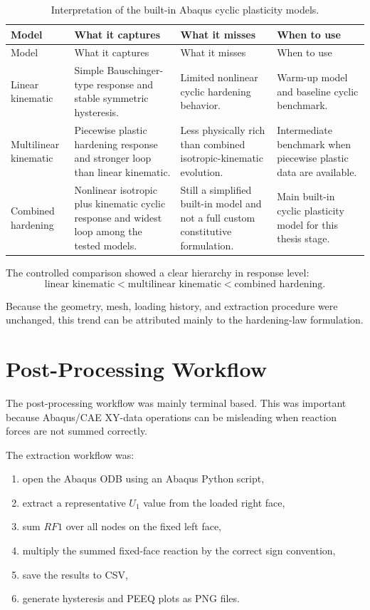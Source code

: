 \documentclass[11pt,a4paper]{article}
\begin{document}
\begin{longtable}{p{}p{}p{}p{}}
\caption{Interpretation of the built-in Abaqus cyclic plasticity models.} \\
\toprule
Model & What it captures & What it misses & When to use \\
\midrule
\endfirsthead
\toprule
Model & What it captures & What it misses & When to use \\
\midrule
\endhead

Linear kinematic &
Simple Bauschinger-type response and stable symmetric hysteresis. &
Limited nonlinear cyclic hardening behavior. &
Warm-up model and baseline cyclic benchmark. \\

Multilinear kinematic &
Piecewise plastic hardening response and stronger loop than linear kinematic. &
Less physically rich than combined isotropic-kinematic evolution. &
Intermediate benchmark when piecewise plastic data are available. \\

Combined hardening &
Nonlinear isotropic plus kinematic cyclic response and widest loop among the tested models. &
Still a simplified built-in model and not a full custom constitutive formulation. &
Main built-in cyclic plasticity model for this thesis stage. \\

\bottomrule
\end{longtable}

The controlled comparison showed a clear hierarchy in response level:
\[
\text{linear kinematic}
<
\text{multilinear kinematic}
<
\text{combined hardening}.
\]

Because the geometry, mesh, loading history, and extraction procedure were unchanged, this trend can be attributed mainly to the hardening-law formulation.

\section{Post-Processing Workflow}

The post-processing workflow was mainly terminal based. This was important because Abaqus/CAE XY-data operations can be misleading when reaction forces are not summed correctly.

The extraction workflow was:
\begin{enumerate}
    \item open the Abaqus ODB using an Abaqus Python script,
    \item extract a representative $U_1$ value from the loaded right face,
    \item sum $RF1$ over all nodes on the fixed left face,
    \item multiply the summed fixed-face reaction by the correct sign convention,
    \item save the results to CSV,
    \item generate hysteresis and PEEQ plots as PNG files.
\end{enumerate}
\end{document}
